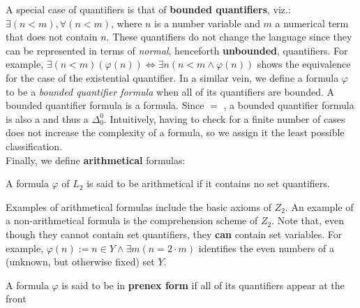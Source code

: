 \documentclass[../main.tex]{memoir}
\begin{document}
A special case of quantifiers is that of \textbf{bounded quantifiers}, viz.: $\exists (n < m), \forall (n < m)$, where $n$ is a number variable and $m$ a numerical term that does not contain $n$. These quantifiers do not change the language since they can be represented in terms of \textit{normal}, henceforth \textbf{unbounded}, quantifiers. For example, $\exists (n < m) (\varphi(n)) \iff \exists n (n < m \land \varphi(n))$ shows the equivalence for the case of the existential quantifier. In a similar vein, we define a formula $\varphi$ to be a \textit{bounded quantifier formula} when all of its quantifiers are bounded. A bounded quantifier formula is a  formula. Since  $ = $ , a bounded quantifier formula is also a  and thus a $\Delta_{0}^{0}$. Intuitively, having to check for a finite number of cases does not increase the complexity of a formula, so we assign it the least possible classification. \\

Finally, we define \textbf{arithmetical} formulas:

\begin{definition}
  A formula $\varphi$ of $L_2$ is said to be arithmetical if it contains no set quantifiers.
\end{definition}

Examples of arithmetical formulas include the basic axioms of $Z_2$. An example of a non-arithmetical formula is the comprehension scheme of $Z_2$. Note that, even though they cannot contain set quantifiers, they \textbf{can} contain set variables. For example, $\varphi(n) := n \in Y \land \exists m (n = 2 \cdot m)$ identifies the even numbers of a (unknown, but otherwise fixed) set $Y$. \\

\begin{definition}
  A formula $\varphi$ is said to be in \textbf{prenex form} if all of its quantifiers appear at the front
\end{definition}
\end{document}
